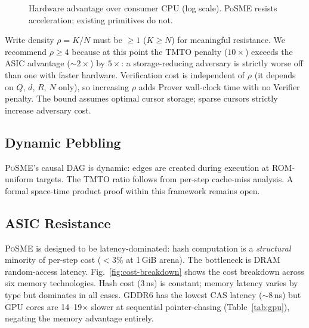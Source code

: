 \documentclass[conference,twocolumn]{IEEEtran}
\newcommand{\posme}{\textsc{PoSME}}
\begin{document}
\begin{figure}[b]
\centering
{}
\caption{Hardware advantage over consumer CPU (log scale).
PoSME resists acceleration; existing primitives do not.}
\label{fig:asic-compare}
\end{figure}

Write density $\rho = K/N$ must be $\geq 1$ ($K \geq N$) for
meaningful resistance. We recommend $\rho \geq 4$ because at
this point the TMTO penalty ($10{\times}$) exceeds the ASIC
advantage (${\sim}2{\times}$) by $5{\times}$: a storage-reducing
adversary is strictly worse off than one with faster hardware.
Verification cost is independent of $\rho$ (it depends on $Q$,
$d$, $R$, $N$ only), so increasing $\rho$ adds Prover wall-clock
time with no Verifier penalty. The bound assumes optimal cursor
storage; sparse cursors strictly increase adversary cost.

\subsection{Dynamic Pebbling}\label{sec:pebbling}

\posme{}'s causal DAG is dynamic: edges are created during
execution at ROM-uniform targets. The TMTO ratio follows from
per-step cache-miss analysis. A formal space-time product proof
within this framework remains open.

\subsection{ASIC Resistance}

\posme{} is designed to be latency-dominated: hash computation
is a \emph{structural} minority of per-step cost ($< 3\%$ at
1\,GiB arena). The bottleneck is DRAM random-access latency.
Fig.~\ref{fig:cost-breakdown} shows the cost breakdown across
six memory technologies. Hash cost (3\,ns) is constant; memory
latency varies by type but dominates in all cases. GDDR6 has
the lowest CAS latency (${\sim}8$\,ns) but GPU cores are
14--19$\times$ slower at sequential pointer-chasing
(Table~\ref{tab:gpu}), negating the memory advantage entirely.
\end{document}
